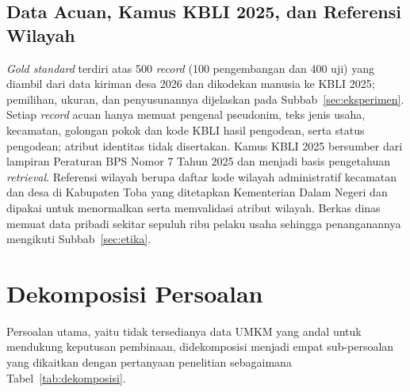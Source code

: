 \subsection{Data Acuan, Kamus KBLI 2025, dan Referensi Wilayah}
\label{sec:data-acuan}

\textit{Gold standard} terdiri atas 500 \textit{record} (100 pengembangan dan 400 uji) yang diambil dari data kiriman desa 2026 dan dikodekan manusia ke KBLI 2025; pemilihan, ukuran, dan penyusunannya dijelaskan pada Subbab~\ref{sec:eksperimen}. Setiap \textit{record} acuan hanya memuat pengenal pseudonim, teks jenis usaha, kecamatan, golongan pokok dan kode KBLI hasil pengodean, serta status pengodean; atribut identitas tidak disertakan. Kamus KBLI 2025 bersumber dari lampiran Peraturan BPS Nomor 7 Tahun 2025 \cite{bps2025perban7} dan menjadi basis pengetahuan \textit{retrieval}. Referensi wilayah berupa daftar kode wilayah administratif kecamatan dan desa di Kabupaten Toba yang ditetapkan Kementerian Dalam Negeri dan dipakai untuk menormalkan serta memvalidasi atribut wilayah. Berkas dinas memuat data pribadi sekitar sepuluh ribu pelaku usaha sehingga penanganannya mengikuti Subbab~\ref{sec:etika}.

\section{Dekomposisi Persoalan}
\label{sec:dekomposisi}

Persoalan utama, yaitu tidak tersedianya data UMKM yang andal untuk mendukung keputusan pembinaan, didekomposisi menjadi empat sub-persoalan yang dikaitkan dengan pertanyaan penelitian sebagaimana Tabel~\ref{tab:dekomposisi}.

